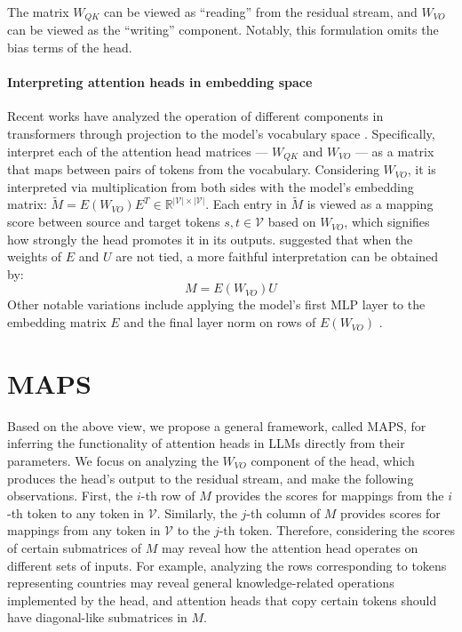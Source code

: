 \documentclass[11pt]{article}
\newcommand{\framework}{\textsc{MAPS}}
\begin{document}
The matrix $W_{QK}$ can be viewed as ``reading'' from the residual stream, and $W_{VO}$ can be viewed as the ``writing'' component. Notably, this formulation omits the bias terms of the head.

\paragraph{Interpreting attention heads in embedding space}

Recent works have analyzed the operation of different components in transformers through projection to the model's vocabulary space \citep{logitlens, geva-etal-2021-transformer, geva-etal-2022-transformer, Dar2022AnalyzingTI, katz-etal-2024-backward}.
Specifically, 
\citet{elhage2021mathematical, Dar2022AnalyzingTI} interpret each of the attention head matrices --- $W_{QK}$ and $W_{VO}$ --- as a matrix that maps between pairs of tokens from the vocabulary. Considering $W_{VO}$, it is interpreted via multiplication from both sides with the model's embedding matrix: ${\tilde{M} = E (W_{VO}) E ^ T  \in \mathbb{R}^{|\mathcal{V}| \times |\mathcal{V}|}}$.
Each entry in $\tilde{M}$ is viewed as a mapping score between source and target tokens ${s, t \in \mathcal{V}}$ based on $W_{VO}$, which signifies how strongly the head promotes it in its outputs. \citet{elhage2021mathematical} suggested that when the weights of $E$ and $U$ are not tied, a more faithful interpretation can be obtained by:
\begin{equation*}
M = E (W_{VO}) U
\end{equation*}
Other notable variations include applying the model's first MLP layer to the embedding matrix $E$ \citep{gould2024successor} and the final layer norm on rows of $ E (W_{VO})$ \citep{wang2022interpretability}.


\section{\framework{}}
\label{sec:analysis_framework}

Based on the above view, we propose a general framework, called \framework{}, for inferring the functionality of attention heads in LLMs directly from their parameters.
We focus on analyzing the $W_{VO}$ component of the head, which produces the head's output to the residual stream,
and make the following observations. First, the $i$-th row of $M$ provides the scores for mappings from the $i$-th token to any token in $\mathcal{V}$. Similarly, the $j$-th column of $M$ provides scores for mappings from any token in $\mathcal{V}$ to the $j$-th token. 
Therefore, considering the scores of certain submatrices of $M$ may reveal how the attention head operates on different sets of inputs. For example, analyzing the rows corresponding to tokens representing countries may reveal general knowledge-related operations implemented by the head, and attention heads that copy certain tokens should have diagonal-like submatrices in $M$.
\end{document}
